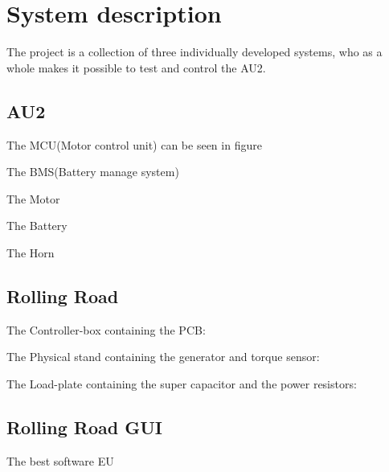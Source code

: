 \chapter{System description}


The project is a collection of three individually developed systems, who as a whole makes it possible to test and control the AU2.

\section{AU2}
The MCU(Motor control unit) can be seen in figure

The BMS(Battery manage system)

The Motor

The Battery

The Horn


\section{Rolling Road}
The Controller-box containing the PCB:

The Physical stand containing the generator and torque sensor:

The Load-plate containing the super capacitor and the power resistors:

\section{Rolling Road GUI}
The best software EU
